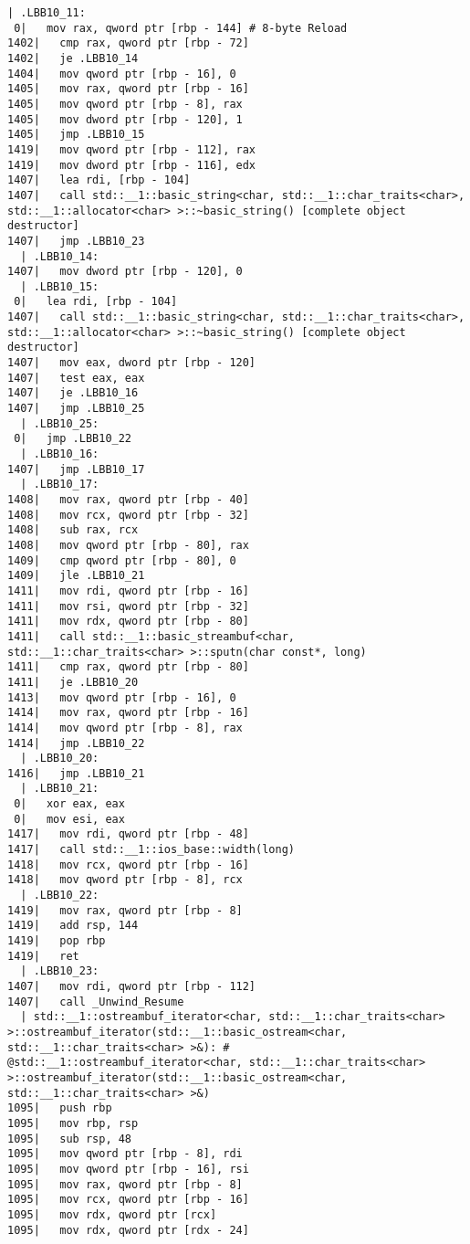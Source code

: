 \begin{lstlisting}[language={},numbers=none,title=\href{https://godbolt.org/z/hwKje8}{\texttt{godbolt.org/z/hwKje8}}]
  | .LBB10_11:
 0|   mov rax, qword ptr [rbp - 144] # 8-byte Reload
1402|   cmp rax, qword ptr [rbp - 72]
1402|   je .LBB10_14
1404|   mov qword ptr [rbp - 16], 0
1405|   mov rax, qword ptr [rbp - 16]
1405|   mov qword ptr [rbp - 8], rax
1405|   mov dword ptr [rbp - 120], 1
1405|   jmp .LBB10_15
1419|   mov qword ptr [rbp - 112], rax
1419|   mov dword ptr [rbp - 116], edx
1407|   lea rdi, [rbp - 104]
1407|   call std::__1::basic_string<char, std::__1::char_traits<char>, std::__1::allocator<char> >::~basic_string() [complete object destructor]
1407|   jmp .LBB10_23
  | .LBB10_14:
1407|   mov dword ptr [rbp - 120], 0
  | .LBB10_15:
 0|   lea rdi, [rbp - 104]
1407|   call std::__1::basic_string<char, std::__1::char_traits<char>, std::__1::allocator<char> >::~basic_string() [complete object destructor]
1407|   mov eax, dword ptr [rbp - 120]
1407|   test eax, eax
1407|   je .LBB10_16
1407|   jmp .LBB10_25
  | .LBB10_25:
 0|   jmp .LBB10_22
  | .LBB10_16:
1407|   jmp .LBB10_17
  | .LBB10_17:
1408|   mov rax, qword ptr [rbp - 40]
1408|   mov rcx, qword ptr [rbp - 32]
1408|   sub rax, rcx
1408|   mov qword ptr [rbp - 80], rax
1409|   cmp qword ptr [rbp - 80], 0
1409|   jle .LBB10_21
1411|   mov rdi, qword ptr [rbp - 16]
1411|   mov rsi, qword ptr [rbp - 32]
1411|   mov rdx, qword ptr [rbp - 80]
1411|   call std::__1::basic_streambuf<char, std::__1::char_traits<char> >::sputn(char const*, long)
1411|   cmp rax, qword ptr [rbp - 80]
1411|   je .LBB10_20
1413|   mov qword ptr [rbp - 16], 0
1414|   mov rax, qword ptr [rbp - 16]
1414|   mov qword ptr [rbp - 8], rax
1414|   jmp .LBB10_22
  | .LBB10_20:
1416|   jmp .LBB10_21
  | .LBB10_21:
 0|   xor eax, eax
 0|   mov esi, eax
1417|   mov rdi, qword ptr [rbp - 48]
1417|   call std::__1::ios_base::width(long)
1418|   mov rcx, qword ptr [rbp - 16]
1418|   mov qword ptr [rbp - 8], rcx
  | .LBB10_22:
1419|   mov rax, qword ptr [rbp - 8]
1419|   add rsp, 144
1419|   pop rbp
1419|   ret
  | .LBB10_23:
1407|   mov rdi, qword ptr [rbp - 112]
1407|   call _Unwind_Resume
  | std::__1::ostreambuf_iterator<char, std::__1::char_traits<char> >::ostreambuf_iterator(std::__1::basic_ostream<char, std::__1::char_traits<char> >&): # @std::__1::ostreambuf_iterator<char, std::__1::char_traits<char> >::ostreambuf_iterator(std::__1::basic_ostream<char, std::__1::char_traits<char> >&)
1095|   push rbp
1095|   mov rbp, rsp
1095|   sub rsp, 48
1095|   mov qword ptr [rbp - 8], rdi
1095|   mov qword ptr [rbp - 16], rsi
1095|   mov rax, qword ptr [rbp - 8]
1095|   mov rcx, qword ptr [rbp - 16]
1095|   mov rdx, qword ptr [rcx]
1095|   mov rdx, qword ptr [rdx - 24]

\end{lstlisting}
